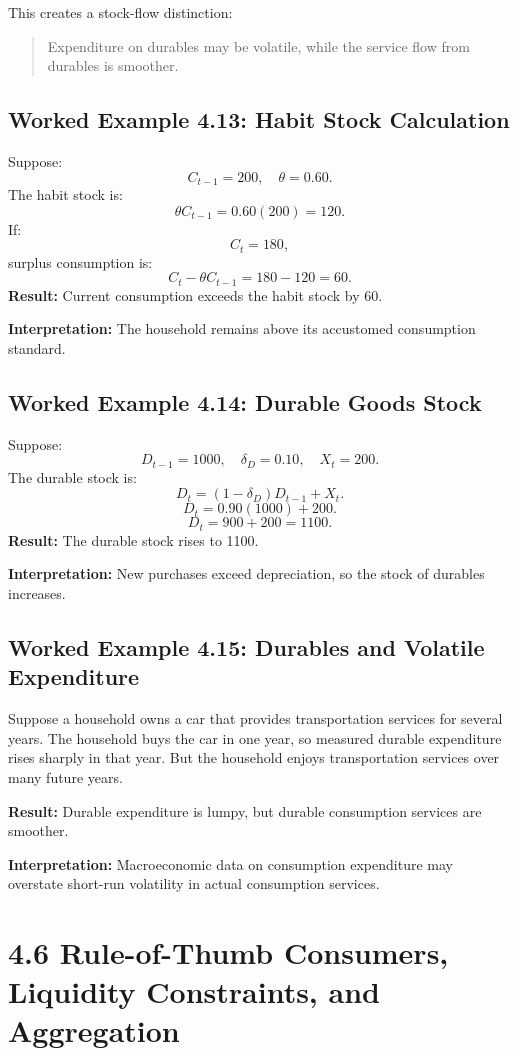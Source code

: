 \documentclass[12pt,a4paper]{article}
\begin{document}
This creates a stock-flow distinction:
\begin{quote}
Expenditure on durables may be volatile, while the service flow from durables is smoother.
\end{quote}

\subsection*{Worked Example 4.13: Habit Stock Calculation}
Suppose:
\[ C_{t-1} = 200, \quad \theta = 0.60. \]
The habit stock is:
\[ \theta C_{t-1} = 0.60(200) = 120. \]
If:
\[ C_t = 180, \]
surplus consumption is:
\[ C_t - \theta C_{t-1} = 180 - 120 = 60. \]
\textbf{Result:} Current consumption exceeds the habit stock by 60.

\textbf{Interpretation:} The household remains above its accustomed consumption standard.

\subsection*{Worked Example 4.14: Durable Goods Stock}
Suppose:
\[ D_{t-1} = 1000, \quad \delta_D = 0.10, \quad X_t = 200. \]
The durable stock is:
\[ D_t = (1 - \delta_D) D_{t-1} + X_t. \]
\[ D_t = 0.90(1000) + 200. \]
\[ D_t = 900 + 200 = 1100. \]
\textbf{Result:} The durable stock rises to 1100.

\textbf{Interpretation:} New purchases exceed depreciation, so the stock of durables increases.

\subsection*{Worked Example 4.15: Durables and Volatile Expenditure}
Suppose a household owns a car that provides transportation services for several years. The household buys the car in one year, so measured durable expenditure rises sharply in that year. But the household enjoys transportation services over many future years.

\textbf{Result:} Durable expenditure is lumpy, but durable consumption services are smoother.

\textbf{Interpretation:} Macroeconomic data on consumption expenditure may overstate short-run volatility in actual consumption services.


\section*{4.6 Rule-of-Thumb Consumers, Liquidity Constraints, and Aggregation}
\end{document}

